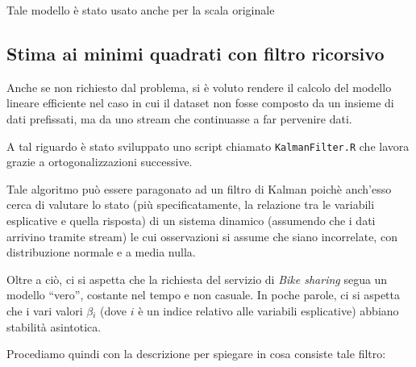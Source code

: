 Tale modello è stato usato anche per la scala originale

\subsection{Stima ai minimi quadrati con filtro ricorsivo}
Anche se non richiesto dal problema, si è voluto rendere il calcolo del
modello lineare efficiente nel caso in cui il dataset non fosse composto da un
insieme di dati prefissati, ma da uno stream che continuasse a far pervenire
dati.

A tal riguardo è stato sviluppato uno script chiamato \texttt{KalmanFilter.R}
che lavora grazie a ortogonalizzazioni successive.

Tale algoritmo può essere paragonato ad un filtro di Kalman poichè anch'esso
cerca di valutare lo stato (più specificatamente, la relazione tra le
variabili esplicative e quella risposta) di un sistema dinamico (assumendo che
i dati arrivino tramite stream) le cui osservazioni si assume che siano
incorrelate, con distribuzione normale e a media nulla.

Oltre a ciò, ci si aspetta che la richiesta del servizio di \emph{Bike sharing}
segua un modello ``vero'', costante nel tempo e non casuale. In poche parole,
ci si aspetta che i vari valori $ \beta{}_i $ (dove $i$ è un indice relativo
alle variabili esplicative) abbiano stabilità asintotica.

Procediamo quindi con la descrizione per spiegare in cosa consiste tale filtro:

